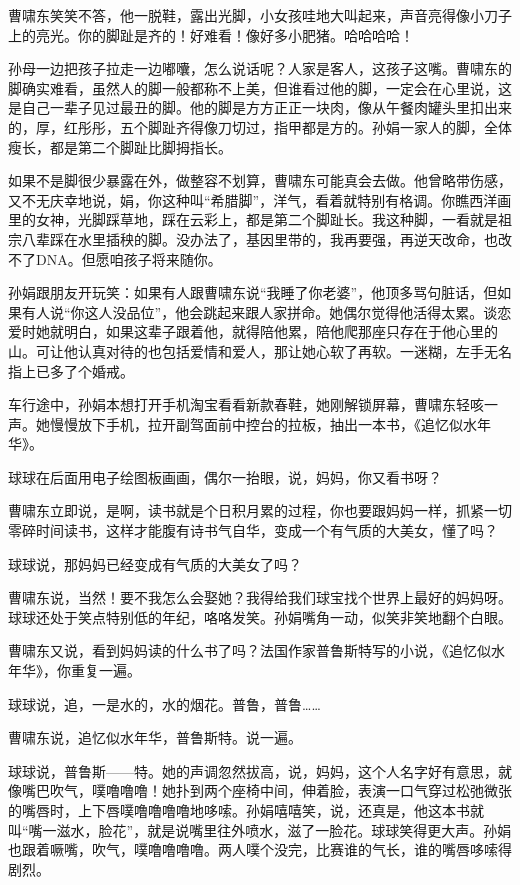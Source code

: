 \documentclass[lang=cn,newtx,12pt,scheme=chinese]{elegantbook}
\begin{document}
曹啸东笑笑不答，他一脱鞋，露出光脚，小女孩哇地大叫起来，声音亮得像小刀子上的亮光。你的脚趾是齐的！好难看！像好多小肥猪。哈哈哈哈！

孙母一边把孩子拉走一边嘟囔，怎么说话呢？人家是客人，这孩子这嘴。曹啸东的脚确实难看，虽然人的脚一般都称不上美，但谁看过他的脚，一定会在心里说，这是自己一辈子见过最丑的脚。他的脚是方方正正一块肉，像从午餐肉罐头里扣出来的，厚，红彤彤，五个脚趾齐得像刀切过，指甲都是方的。孙娟一家人的脚，全体瘦长，都是第二个脚趾比脚拇指长。

如果不是脚很少暴露在外，做整容不划算，曹啸东可能真会去做。他曾略带伤感，又不无庆幸地说，娟，你这种叫“希腊脚”，洋气，看着就特别有格调。你瞧西洋画里的女神，光脚踩草地，踩在云彩上，都是第二个脚趾长。我这种脚，一看就是祖宗八辈踩在水里插秧的脚。没办法了，基因里带的，我再要强，再逆天改命，也改不了DNA。但愿咱孩子将来随你。

孙娟跟朋友开玩笑：如果有人跟曹啸东说“我睡了你老婆”，他顶多骂句脏话，但如果有人说“你这人没品位”，他会跳起来跟人家拼命。她偶尔觉得他活得太累。谈恋爱时她就明白，如果这辈子跟着他，就得陪他累，陪他爬那座只存在于他心里的山。可让他认真对待的也包括爱情和爱人，那让她心软了再软。一迷糊，左手无名指上已多了个婚戒。

车行途中，孙娟本想打开手机淘宝看看新款春鞋，她刚解锁屏幕，曹啸东轻咳一声。她慢慢放下手机，拉开副驾面前中控台的拉板，抽出一本书，《追忆似水年华》。

球球在后面用电子绘图板画画，偶尔一抬眼，说，妈妈，你又看书呀？

曹啸东立即说，是啊，读书就是个日积月累的过程，你也要跟妈妈一样，抓紧一切零碎时间读书，这样才能腹有诗书气自华，变成一个有气质的大美女，懂了吗？

球球说，那妈妈已经变成有气质的大美女了吗？

曹啸东说，当然！要不我怎么会娶她？我得给我们球宝找个世界上最好的妈妈呀。球球还处于笑点特别低的年纪，咯咯发笑。孙娟嘴角一动，似笑非笑地翻个白眼。

曹啸东又说，看到妈妈读的什么书了吗？法国作家普鲁斯特写的小说，《追忆似水年华》，你重复一遍。

球球说，追，一是水的，水的烟花。普鲁，普鲁……

曹啸东说，追忆似水年华，普鲁斯特。说一遍。

球球说，普鲁斯——特。她的声调忽然拔高，说，妈妈，这个人名字好有意思，就像嘴巴吹气，噗噜噜噜！她扑到两个座椅中间，伸着脸，表演一口气穿过松弛微张的嘴唇时，上下唇噗噜噜噜噜地哆嗦。孙娟嘻嘻笑，说，还真是，他这本书就叫“嘴一滋水，脸花”，就是说嘴里往外喷水，滋了一脸花。球球笑得更大声。孙娟也跟着噘嘴，吹气，噗噜噜噜噜。两人噗个没完，比赛谁的气长，谁的嘴唇哆嗦得剧烈。
\end{document}
